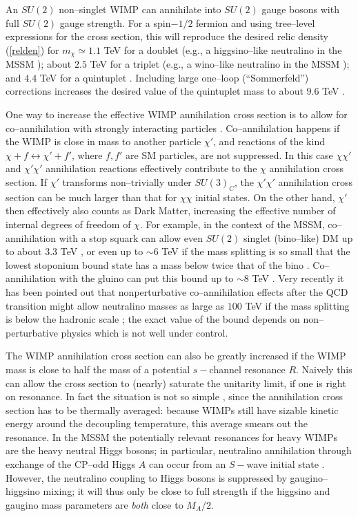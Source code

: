 \documentclass[a4paper,11pt]{article}
\begin{document}
An $SU(2)$ non--singlet WIMP can annihilate into $SU(2)$ gauge bosons
with full $SU(2)$ gauge strength. For a spin$-1/2$ fermion and using
tree--level expressions for the cross section, this will reproduce the
desired relic density (\ref{relden}) for $m_\chi \simeq 1.1$ TeV for a
doublet (e.g., a higgsino--like neutralino in the MSSM
\cite{Edsjo:1997bg}); about $2.5$ TeV for a triplet (e.g., a
wino--like neutralino in the MSSM \cite{Edsjo:1997bg}); and $4.4$ TeV
for a quintuplet \cite{Cirelli:2005uq}. Including large one--loop
(``Sommerfeld'') corrections increases the desired value of the quintuplet
mass to about $9.6$ TeV \cite{Cirelli:2009uv}.

One way to increase the effective WIMP annihilation cross section is
to allow for co--annihilation with strongly interacting particles
\cite{Griest:1990kh}. Co--annihilation happens if the WIMP is close in
mass to another particle $\chi'$, and reactions of the kind
$\chi + f \leftrightarrow \chi' + f'$, where $f, f'$ are SM
particles, are not suppressed. In this case $\chi \chi'$ and
$\chi'\chi'$ annihilation reactions effectively contribute to the
$\chi$ annihilation cross section. If $\chi'$ transforms
non--trivially under $SU(3)_C$, the $\chi' \chi'$ annihilation cross
section can be much larger than that for $\chi \chi$ initial
states. On the other hand, $\chi'$ then effectively also counts as
Dark Matter, increasing the effective number of internal degrees of
freedom of $\chi$. For example, in the context of the MSSM,
co--annihilation with a stop squark \cite{Boehm:1999bj} can allow even
$SU(2)$ singlet (bino--like) DM up to about $3.3$ TeV
\cite{Harz:2018csl}, or even up to $\sim 6$ TeV if the mass splitting
is so small that the lowest stoponium bound state has a mass below
twice that of the bino \cite{Biondini:2018pwp}. Co--annihilation with
the gluino \cite{Profumo:2004wk} can put this bound up to $\sim 8$ TeV
\cite{Ellis:2015vaa}. Very recently it has been pointed out that
nonperturbative co--annihilation effects after the QCD transition
might allow neutralino masses as large as $100$ TeV if the mass splitting
is below the hadronic scale \cite{coan_new}; the exact value of the
bound depends on non--perturbative physics which is not well under
control.

The WIMP annihilation cross section can also be greatly increased if
the WIMP mass is close to half the mass of a potential $s-$channel
resonance $R$. Naively this can allow the cross section to
(nearly) saturate the unitarity limit, if one is right on resonance.
In fact the situation is not so simple \cite{Griest:1990kh}, since the
annihilation cross section has to be thermally averaged: because WIMPs
still have sizable kinetic energy around the decoupling temperature,
this average smears out the resonance. In the MSSM the potentially
relevant resonances for heavy WIMPs are the heavy neutral Higgs
bosons; in particular, neutralino annihilation through exchange of the
CP--odd Higgs $A$ can occur from an $S-$wave initial state
\cite{Drees:1992am}. However, the neutralino coupling to Higgs bosons
is suppressed by gaugino--higgsino mixing; it will thus only be close
to full strength if the higgsino and gaugino mass parameters are {\em
  both} close to $M_A/2$.
\end{document}
